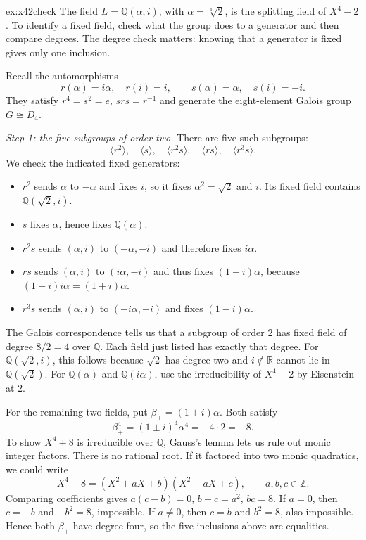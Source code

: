 \begin{solution}{ex:x42check}
\idea The field $L=\mathbb Q(\alpha,i)$, with $\alpha=\sqrt[4]{2}$, is the splitting field of $X^4-2$. To identify a fixed field, check what the group does to a generator and then compare degrees. The degree check matters: knowing that a generator is fixed gives only one inclusion.

\writeup Recall the automorphisms
\[
r(\alpha)=i\alpha,\quad r(i)=i,\qquad
s(\alpha)=\alpha,\quad s(i)=-i.
\]
They satisfy $r^4=s^2=e$, $srs=r^{-1}$ and generate the eight-element Galois group $G\cong D_4$.

\emph{Step 1: the five subgroups of order two.}
There are five such subgroups:
\[
\langle r^2\rangle,\quad\langle s\rangle,\quad
\langle r^2s\rangle,\quad\langle rs\rangle,\quad
\langle r^3s\rangle.
\]
We check the indicated fixed generators:
\begin{itemize}
\item $r^2$ sends $\alpha$ to $-\alpha$ and fixes $i$, so it fixes $\alpha^2=\sqrt2$ and $i$. Its fixed field contains $\mathbb Q(\sqrt2,i)$.
\item $s$ fixes $\alpha$, hence fixes $\mathbb Q(\alpha)$.
\item $r^2s$ sends $(\alpha,i)$ to $(-\alpha,-i)$ and therefore fixes $i\alpha$.
\item $rs$ sends $(\alpha,i)$ to $(i\alpha,-i)$ and thus fixes $(1+i)\alpha$, because $(1-i)i\alpha=(1+i)\alpha$.
\item $r^3s$ sends $(\alpha,i)$ to $(-i\alpha,-i)$ and fixes $(1-i)\alpha$.
\end{itemize}
The Galois correspondence tells us that a subgroup of order $2$ has fixed field of degree $8/2=4$ over $\mathbb Q$. Each field just listed has exactly that degree. For $\mathbb Q(\sqrt2,i)$, this follows because $\sqrt2$ has degree two and $i\notin\mathbb R$ cannot lie in $\mathbb Q(\sqrt2)$. For $\mathbb Q(\alpha)$ and $\mathbb Q(i\alpha)$, use the irreducibility of $X^4-2$ by Eisenstein at $2$.

For the remaining two fields, put $\beta_\pm=(1\pm i)\alpha$. Both satisfy
\[
\beta_\pm^4=(1\pm i)^4\alpha^4=-4\cdot2=-8.
\]
To show $X^4+8$ is irreducible over $\mathbb Q$, Gauss's lemma lets us rule out monic integer factors. There is no rational root. If it factored into two monic quadratics, we could write
\[
X^4+8=(X^2+aX+b)(X^2-aX+c),
\qquad a,b,c\in\mathbb Z.
\]
Comparing coefficients gives $a(c-b)=0$, $b+c=a^2$, $bc=8$. If $a=0$, then $c=-b$ and $-b^2=8$, impossible. If $a\ne0$, then $c=b$ and $b^2=8$, also impossible. Hence both $\beta_\pm$ have degree four, so the five inclusions above are equalities.


\end{solution}
